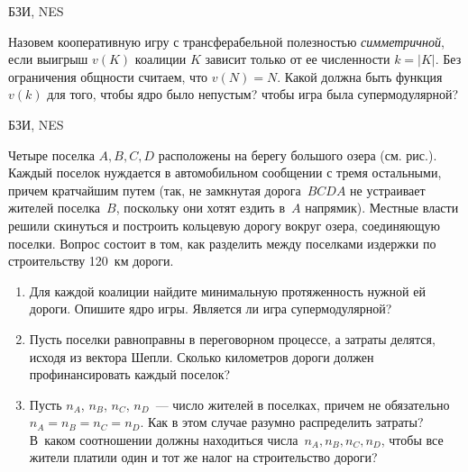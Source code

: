 \begin{problem} 
\begin{source}
БЗИ, NES
\end{source}
Назовем кооперативную игру с
трансферабельной полезностью {\it симметричной}, если
выигрыш $v(K)$ коалиции $K$ зависит только от ее
численности $k=|K|$. Без ограничения общности считаем, что
$v(N)=N$. Какой должна быть функция $v(k)$ для того, чтобы
ядро было непустым? чтобы игра была супермодулярной?

\begin{sol}

\end{sol}
\end{problem}




\begin{problem} 
\begin{source}
БЗИ, NES
\end{source} Четыре поселка $A,B,C,D$
расположены на берегу большого озера (см. рис.). Каждый
поселок нуждается в автомобильном сообщении с тремя
остальными, причем кратчайшим путем (так, не замкнутая
дорога~$B C D A$ не устраивает жителей поселка~$B$,
поскольку они хотят ездить в~$A$ напрямик). Местные власти
решили скинуться и построить кольцевую дорогу вокруг озера,
соединяющую поселки. Вопрос состоит в том, как разделить
между поселками издержки по строительству 120~км дороги.

\begin{enumerate}

\item Для каждой коалиции найдите минимальную протяженность
нужной ей дороги. Опишите ядро игры. Является ли игра
супермодулярной?

\item Пусть поселки равноправны в переговорном процессе, а
затраты делятся, исходя из вектора Шепли. Сколько
километров дороги должен профинансировать каждый поселок?

\item Пусть $n_A$, $n_B$, $n_C$, $n_D$~--- число жителей в
поселках, причем не обязательно $n_A=n_B=n_C=n_D$. Как в
этом случае разумно распределить затраты? В~каком
соотношении должны находиться числа~$n_A,n_B,n_C,n_D$,
чтобы все жители платили один и тот же налог на
строительство дороги?

\end{enumerate}


\end{problem}
